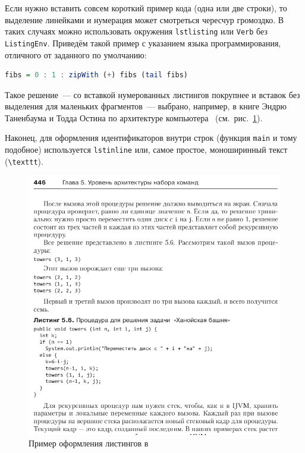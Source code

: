 Если нужно вставить совсем короткий пример кода (одна или две строки), то выделение  линейками и нумерация может смотреться чересчур громоздко. В таких случаях можно использовать окружения \texttt{lstlisting} или \texttt{Verb} без \texttt{ListingEnv}. Приведём такой пример с указанием языка программирования, отличного от заданного по умолчанию:
\begin{lstlisting}[language=Haskell]
fibs = 0 : 1 : zipWith (+) fibs (tail fibs)
\end{lstlisting}
Такое решение~--- со вставкой нумерованных листингов покрупнее
и вставок без выделения для маленьких фрагментов~--- выбрано,
например, в книге Эндрю Таненбаума и Тодда Остина по архитектуре
компьютера~\autocite{TanAus2013} (см.~рис.~\ref{fig:tan-aus}).

Наконец, для оформления идентификаторов внутри строк
(функция \lstinline{main} и тому подобное) используется
\texttt{lstinline} или, самое простое, моноширинный текст
(\texttt{\textbackslash texttt}).

\begin{figure}[p]%
\centering
\includegraphics[width=\textwidth]{img/tan-aus.png}
\caption{\label{fig:tan-aus}Пример оформления листингов в~\autocite{TanAus2013}}
\end{figure}


